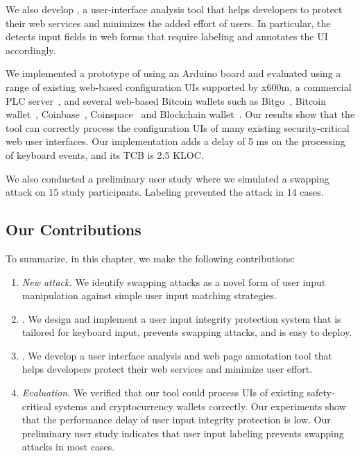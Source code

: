 We also develop \tool, a user-interface analysis tool that helps developers to protect their web services and minimizes the added effort of users. In particular, the \tool detects input fields in web forms that require labeling and annotates the UI accordingly. 

We implemented a prototype of \device using an Arduino board and evaluated \tool using a range of existing web-based configuration UIs supported by x600m, a commercial PLC server~\cite{controlbyweb}, and several web-based Bitcoin wallets such as Bitgo~\cite{bitgo}, Bitcoin wallet~\cite{bitcoinwallet}, Coinbase~\cite{coinbase}, Coinspace~\cite{coin} and Blockchain wallet~\cite{blockchain}. Our results show that the tool can correctly process the configuration UIs of many existing security-critical web user interfaces. Our \device implementation adds a delay of 5 ms on the processing of keyboard events, and its TCB is 2.5 KLOC. 

We also conducted a preliminary user study where we simulated a swapping attack on 15 study participants. Labeling prevented the attack in 14 cases.


\subsection{Our Contributions} To summarize, in this chapter, we make the following contributions:

\begin{enumerate}
    \item \emph{New attack.} We identify swapping attacks as a novel form of user input manipulation against simple user input matching strategies.
    \item \name. We design and implement a user input integrity protection system that is tailored for keyboard input, prevents swapping attacks, and is easy to deploy.
    \item \tool. We develop a user interface analysis and web page annotation tool that helps developers protect their web services and minimize user effort.
    \item \emph{Evaluation.} We verified that our tool could process UIs of existing safety-critical systems and cryptocurrency wallets correctly. Our experiments show that the performance delay of \name user input integrity protection is low. Our preliminary user study indicates that user input labeling prevents swapping attacks in most cases.
\end{enumerate}


